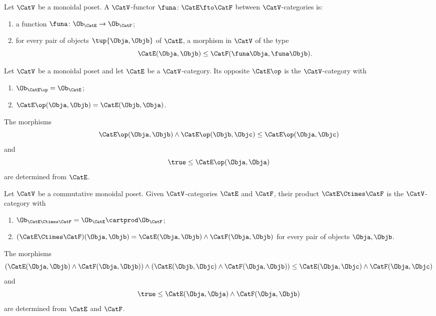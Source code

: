 \begin{ctdefinition}
Let $\CatV$ be a monoidal poset. A $\CatV$-functor $\funa \colon \CatE \fto \CatF$ between $\CatV$-categories is:

\constit
\begin{enumerate}
\item a function $\funa \colon \Ob_\CatE \to \Ob_\CatF$;
\item for every pair of objects $\tup{\Obja, \Objb}$ of $\CatE$, a morphism in $\CatV$ of the type
\begin{equation}
\CatE(\Obja, \Objb) \leq \CatF(\funa \Obja, \funa \Objb). 
\end{equation}
\end{enumerate}
\end{ctdefinition}


\begin{ctdefinition}
Let $\CatV$ be a monoidal poset and let $\CatE$ be a $\CatV$-category. Its opposite $\CatE\op$ is the $\CatV$-category with 
\begin{enumerate}
\item $\Ob_{\CatE\op} = \Ob_\CatE$;
\item $\CatE\op(\Obja, \Objb) = \CatE(\Objb, \Obja)$.
\end{enumerate}

The morphisms 
\begin{equation}
\CatE\op(\Obja, \Objb) \wedge \CatE\op(\Objb, \Objc) \leq \CatE\op(\Obja, \Objc)
\end{equation}
and
\begin{equation}
\true \leq \CatE\op(\Obja, \Obja)
\end{equation}
are determined from $\CatE$.
\end{ctdefinition}

\begin{ctdefinition}
Let $\CatV$ be a commutative monoidal poset. Given $\CatV$-categories $\CatE$ and $\CatF$, their product $\CatE \Ctimes \CatF$ is the $\CatV$-category with 
\begin{enumerate}
\item $\Ob_{\CatE \Ctimes \CatF} = \Ob_\CatE \cartprod \Ob_\CatF$;
\item $(\CatE \Ctimes \CatF)(\Obja, \Objb) = \CatE (\Obja, \Objb) \wedge \CatF (\Obja, \Objb)$ for every pair of objects $\Obja, \Objb$. 
\end{enumerate}
The morphisms 
\begin{equation}
(\CatE(\Obja, \Objb) \wedge \CatF(\Obja, \Objb)) \wedge (\CatE(\Objb, \Objc) \wedge \CatF(\Obja, \Objb)) \leq \CatE(\Obja, \Objc) \wedge  \CatF(\Obja, \Objc)
\end{equation}
and
\begin{equation}
\true \leq \CatE(\Obja, \Obja) \wedge \CatF(\Obja, \Objb)
\end{equation}
are determined from $\CatE$ and $\CatF$.
\end{ctdefinition}


